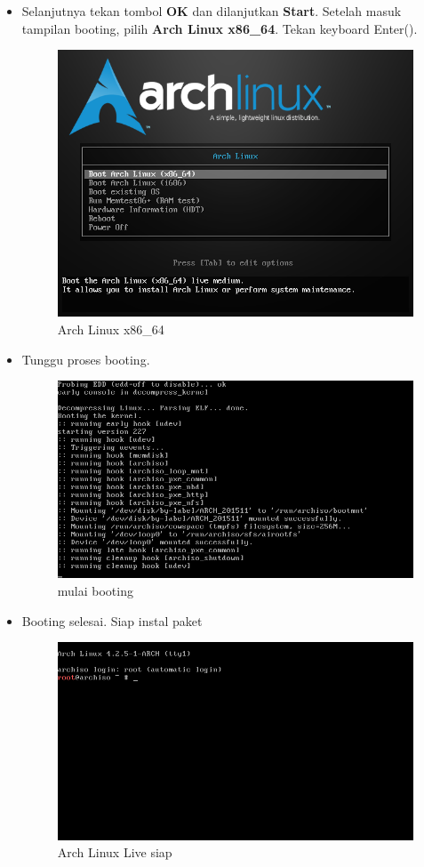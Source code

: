\documentclass[12pt,]{article}
\begin{document}
\begin{itemize}
		\item Selanjutnya tekan tombol \textbf{OK} dan dilanjutkan \textbf{Start}.
		Setelah masuk tampilan booting, pilih \textbf{Arch Linux x86\_64}.
		Tekan keyboard Enter(\keys{\return}).
		\begin{figure}[H]
			\centering
			\includegraphics[width=0.6\linewidth]{images/vbox_linuxinstall/s1}
			\caption{Arch Linux x86\_64}
		\end{figure}

		\item Tunggu proses booting.
		\begin{figure}[H]
			\centering
			\includegraphics[width=0.6\linewidth]{images/vbox_linuxinstall/s2}
			\caption{mulai booting}
		\end{figure}

		\item Booting selesai. Siap instal paket
		\begin{figure}[H]
			\centering
			\includegraphics[width=0.6\linewidth]{images/vbox_linuxinstall/s3}
			\caption{Arch Linux Live siap}
		\end{figure}
	\end{itemize}
\end{document}
